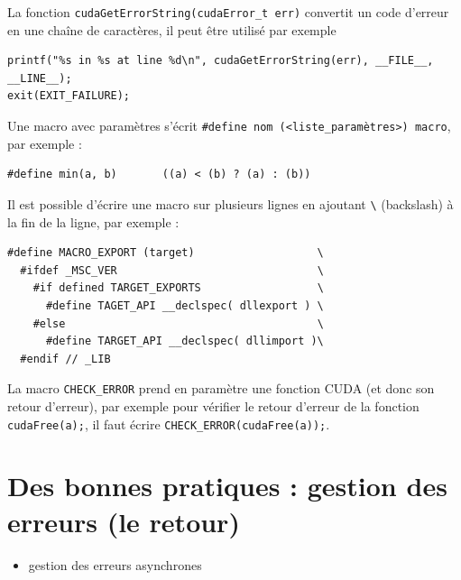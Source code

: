 \begin{howto}{}
La fonction {\tt cudaGetErrorString(cudaError\_t err)} convertit un code d'erreur en une chaîne de caractères, il peut être utilisé par exemple 
\begin{verbatim}
printf("%s in %s at line %d\n", cudaGetErrorString(err), __FILE__, __LINE__);
exit(EXIT_FAILURE);
\end{verbatim}
\end{howto} 

\begin{howto}{}
Une macro avec paramètres s'écrit {\tt \#define nom (<liste\_paramètres>) macro}, par exemple :
\begin{verbatim}
#define min(a, b)       ((a) < (b) ? (a) : (b))
\end{verbatim}
\end{howto} 

\begin{howto}{}
Il est possible d'écrire une macro sur plusieurs lignes en ajoutant {\tt \textbackslash} (backslash) à la fin de la ligne, par exemple : 
\begin{verbatim}
#define MACRO_EXPORT (target)                   \
  #ifdef _MSC_VER                               \
    #if defined TARGET_EXPORTS                  \
      #define TAGET_API __declspec( dllexport ) \
    #else                                       \
      #define TARGET_API __declspec( dllimport )\
  #endif // _LIB 
\end{verbatim}
\end{howto} 

\begin{howto}{}
La macro {\tt CHECK\_ERROR} prend en paramètre une fonction CUDA (et donc son retour d'erreur), par exemple pour vérifier le retour d'erreur de la fonction {\tt cudaFree(a);}, il faut écrire {\tt CHECK\_ERROR(cudaFree(a));}.
\end{howto} 


  \section{Des bonnes pratiques : gestion des erreurs (le retour)}

\begin{objectif}[]{}
 \begin{itemize}
	\item gestion des erreurs asynchrones
\end{itemize}
\end{objectif}

